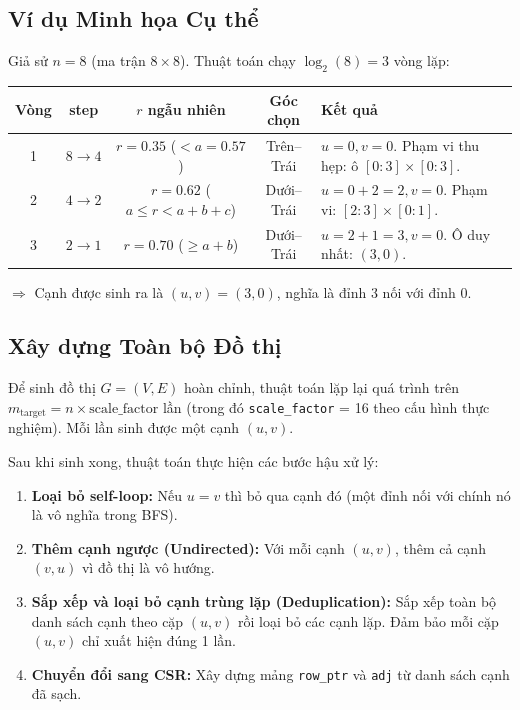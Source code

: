 \documentclass[12pt,a4paper]{article}
\begin{document}
\subsection{Ví dụ Minh họa Cụ thể}

Giả sử $n = 8$ (ma trận $8 \times 8$). Thuật toán chạy $\log_2(8) = 3$ vòng lặp:

\begin{table}[H]
\centering
\begin{tabularx}{\textwidth}{ccccX}
\toprule
\textbf{Vòng} & \textbf{step} & \textbf{$r$ ngẫu nhiên} & \textbf{Góc chọn} & \textbf{Kết quả} \\
\midrule
1 & $8 \rightarrow 4$ & $r = 0.35$ ($ < a = 0.57$) & Trên--Trái & $u=0, v=0$. Phạm vi thu hẹp: ô $[0{:}3] \times [0{:}3]$. \\
2 & $4 \rightarrow 2$ & $r = 0.62$ ($a \leq r < a{+}b{+}c$) & Dưới--Trái & $u = 0 + 2 = 2, v = 0$. Phạm vi: $[2{:}3] \times [0{:}1]$. \\
3 & $2 \rightarrow 1$ & $r = 0.70$ ($\geq a{+}b$) & Dưới--Trái & $u = 2 + 1 = 3, v = 0$. Ô duy nhất: $(3, 0)$. \\
\bottomrule
\end{tabularx}
\end{table}

$\Rightarrow$ Cạnh được sinh ra là $(u, v) = (3, 0)$, nghĩa là đỉnh 3 nối với đỉnh 0.

\subsection{Xây dựng Toàn bộ Đồ thị}

Để sinh đồ thị $G = (V, E)$ hoàn chỉnh, thuật toán lặp lại quá trình trên $m_{\text{target}} = n \times \text{scale\_factor}$ lần (trong đó \texttt{scale\_factor} = 16 theo cấu hình thực nghiệm). Mỗi lần sinh được một cạnh $(u, v)$.

Sau khi sinh xong, thuật toán thực hiện các bước hậu xử lý:

\begin{enumerate}
  \item \textbf{Loại bỏ self-loop:} Nếu $u = v$ thì bỏ qua cạnh đó (một đỉnh nối với chính nó là vô nghĩa trong BFS).

  \item \textbf{Thêm cạnh ngược (Undirected):} Với mỗi cạnh $(u, v)$, thêm cả cạnh $(v, u)$ vì đồ thị là vô hướng.

  \item \textbf{Sắp xếp và loại bỏ cạnh trùng lặp (Deduplication):} Sắp xếp toàn bộ danh sách cạnh theo cặp $(u, v)$ rồi loại bỏ các cạnh lặp. Đảm bảo mỗi cặp $(u, v)$ chỉ xuất hiện đúng 1 lần.

  \item \textbf{Chuyển đổi sang CSR:} Xây dựng mảng \texttt{row\_ptr} và \texttt{adj} từ danh sách cạnh đã sạch.
\end{enumerate}
\end{document}
